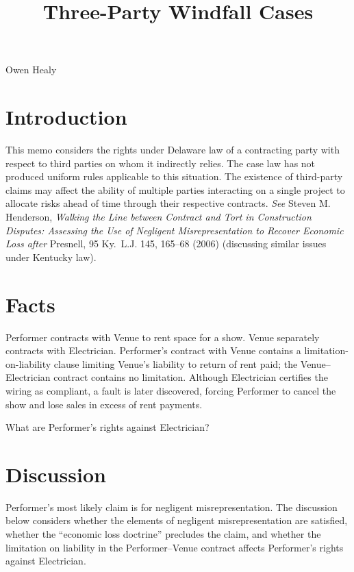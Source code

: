 \documentclass[
  12pt,
  letterpaper,
]{scrartcl}
\title{Three-Party Windfall Cases}
\author{}
\date{}
\begin{document}
\begin{center}
{\noindent Owen Healy}

\vspace{1.0ex}{\noindent Writing Sample}
\end{center}


\vspace{-5.0ex}\hypertarget{introduction}{%
\section{Introduction}\label{introduction}}

This memo considers the rights under Delaware law of a contracting party with respect to
third parties on whom it indirectly relies. The case law has not
produced uniform rules applicable to this situation. The existence of
third-party claims may affect the ability of multiple parties
interacting on a single project to allocate risks ahead of time through
their respective contracts. \emph{See} Steven M. Henderson,
\emph{Walking the Line between Contract and Tort in Construction
Disputes: Assessing the Use of Negligent Misrepresentation to Recover
Economic Loss after} Presnell, 95 Ky.~L.J. 145, 165--68 (2006)
(discussing similar issues under Kentucky law).

\hypertarget{facts}{%
\section{Facts}\label{facts}}

Performer contracts with Venue to rent space for a show. Venue
separately contracts with Electrician. Performer's contract with Venue
contains a limitation-on-liability clause limiting Venue's liability to
return of rent paid; the Venue--Electrician contract contains no
limitation. Although Electrician certifies the wiring as compliant, a
fault is later discovered, forcing Performer to cancel the show and lose
sales in excess of rent payments.

What are Performer's rights against Electrician?

\hypertarget{discussion}{%
\section{Discussion}\label{discussion}}

Performer's most likely claim is for negligent misrepresentation. The
discussion below considers whether the elements of negligent
misrepresentation are satisfied, whether the ``economic loss doctrine''
precludes the claim, and whether the limitation on liability in the
Performer--Venue contract affects Performer's rights against
Electrician.
\end{document}
